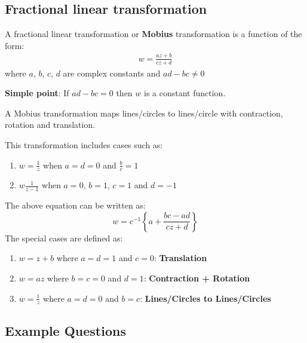 \documentclass[10pt,a4paper]{article}
\begin{document}
\pagebreak

\subsection{Fractional linear transformation}

A fractional linear transformation or \textbf{Mobius} transformation is a function of the form:
\begin{align*}
    w=\frac{az+b}{cz+d}
\end{align*}
where $a$, $b$, $c$, $d$ are complex constants and $ad-bc \neq 0$

\textbf{Simple point}: If $ad-bc= 0$ then $w$ is a constant function.

A Mobius transformation maps lines/circles to lines/circle with contraction, rotation and
translation. \par 
This transformation includes cases such as:
\begin{enumerate}
    \item $w=\frac{1}{z}$ when $a=d=0$ and $\frac{b}{c}=1$
    \item $w\frac{1}{z-1}$ when $a=0$, $b=1$, $c=1$ and $d=-1$
\end{enumerate}

The above equation can be written as:
$$w=c^{-1}\left\{a+\frac{bc-ad}{cz+d}\right\}$$
The special cases are defined as:
\begin{enumerate}
    \item $w=z+b$ where $a=d=1$ and $c=0$: \textbf{Translation}
    \item $w=az$ where $b=c=0$ and $d=1$: \textbf{Contraction + Rotation}
    \item $w=\frac{1}{z}$ where $a=d=0$ and $b=c$: \textbf{Lines/Circles to Lines/Circles}
\end{enumerate}

\pagebreak

\subsection{Example Questions}
\end{document}

